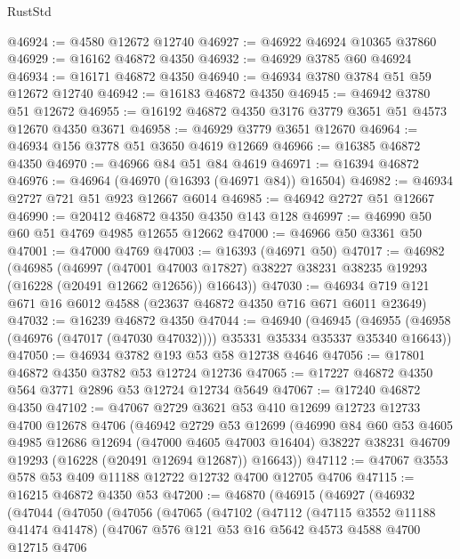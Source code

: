 \begin{lexlean}{RustStd}
\begin{coremodule}
@46924 := @4580 @12672 @12740
@46927 := @46922 @46924 @10365 @37860
@46929 := @16162 @46872 @4350
@46932 := @46929 @3785 @60 @46924
@46934 := @16171 @46872 @4350
@46940 := @46934 @3780 @3784 @51 @59 @12672 @12740
@46942 := @16183 @46872 @4350
@46945 := @46942 @3780 @51 @12672
@46955 := @16192 @46872 @4350 @3176 @3779 @3651 @51 @4573 @12670 @4350 @3671
@46958 := @46929 @3779 @3651 @12670
@46964 := @46934 @156 @3778 @51 @3650 @4619 @12669
@46966 := @16385 @46872 @4350
@46970 := @46966 @84 @51 @84 @4619
@46971 := @16394 @46872
@46976 := @46964 (@46970 (@16393 (@46971 @84)) @16504)
@46982 := @46934 @2727 @721 @51 @923 @12667 @6014
@46985 := @46942 @2727 @51 @12667
@46990 := @20412 @46872 @4350 @4350 @143 @128
@46997 := @46990 @50 @60 @51 @4769 @4985 @12655 @12662
@47000 := @46966 @50 @3361 @50
@47001 := @47000 @4769
@47003 := @16393 (@46971 @50)
@47017 := @46982
    (@46985
      (@46997
        (@47001 @47003 @17827)
        @38227
        @38231
        @38235
        @19293
        (@16228 (@20491 @12662 @12656))
        @16643))
@47030 := @46934 @719 @121 @671 @16 @6012 @4588 (@23637 @46872 @4350 @716 @671 @6011 @23649)
@47032 := @16239 @46872 @4350
@47044 := @46940
    (@46945 (@46955 (@46958 (@46976 (@47017 (@47030 @47032)))) @35331 @35334 @35337 @35340 @16643))
@47050 := @46934 @3782 @193 @53 @58 @12738 @4646
@47056 := @17801 @46872 @4350 @3782 @53 @12724 @12736
@47065 := @17227 @46872 @4350 @564 @3771 @2896 @53 @12724 @12734 @5649
@47067 := @17240 @46872 @4350
@47102 := @47067
    @2729
    @3621
    @53
    @410
    @12699
    @12723
    @12733
    @4700
    @12678
    @4706
    (@46942
      @2729
      @53
      @12699
      (@46990
        @84
        @60
        @53
        @4605
        @4985
        @12686
        @12694
        (@47000 @4605 @47003 @16404)
        @38227
        @38231
        @46709
        @19293
        (@16228 (@20491 @12694 @12687))
        @16643))
@47112 := @47067 @3553 @578 @53 @409 @11188 @12722 @12732 @4700 @12705 @4706
@47115 := @16215 @46872 @4350 @53
@47200 := @46870
    (@46915
      (@46927
        (@46932
          (@47044
            (@47050
              (@47056
                (@47065
                  (@47102
                    (@47112
                      (@47115 @3552 @11188 @41474 @41478)
                      (@47067
                        @576
                        @121
                        @53
                        @16
                        @5642
                        @4573
                        @4588
                        @4700
                        @12715
                        @4706

\end{coremodule}
\end{lexlean}
